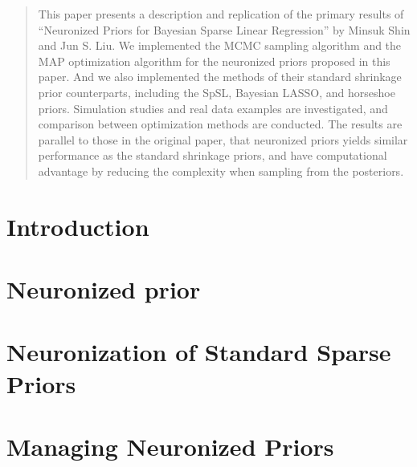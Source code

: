 \documentclass[11pt]{article}
\theoremstyle{definition}
\begin{document}

\begin{abstract}
  This paper presents a description and replication of the primary results of ``Neuronized Priors for Bayesian Sparse Linear Regression'' by Minsuk Shin and Jun S. Liu. We implemented the MCMC sampling algorithm and the MAP optimization algorithm for the neuronized priors proposed in this paper. And we also implemented the methods of their standard shrinkage prior counterparts, including the SpSL, Bayesian LASSO, and horseshoe priors. Simulation studies and real data examples are investigated, and comparison between optimization methods are conducted. The results are parallel to those in the original paper, that neuronized priors yields similar performance as the standard shrinkage priors, and have computational advantage by reducing the complexity when sampling from the posteriors.
\end{abstract}

\section{Introduction}



\section{Neuronized prior} \label{sec:neu_def}



\section{Neuronization of Standard Sparse Priors}



\section{Managing Neuronized Priors }
\end{document}
